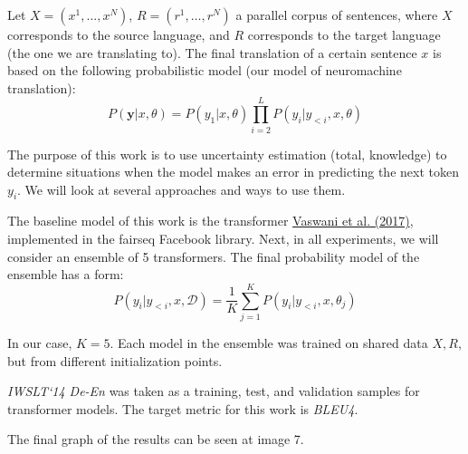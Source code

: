\documentclass[a4paper,14pt]{extarticle}
\newcommand{\bibref}[3]{\hyperlink{#1}{#2 (#3)}}
\begin{document}
	Let $X = (x^1, \dots, x^N)$, $R = (r^1, \dots, r^N)$ a parallel corpus of sentences, where $X$ corresponds to the source language, and $R$ corresponds to the target language (the one we are translating to). The final translation of a certain sentence $x$ is based on the following probabilistic model (our model of neuromachine translation):
	\begin{equation*}
		P(\textbf{y} | x, \theta) = P(y_1 | x, \theta) \prod_{i=2}^{L} P(y_i | y_{<i}, x, \theta)
	\end{equation*}
	
	The purpose of this work is to use uncertainty estimation (total, knowledge) to determine situations when the model makes an error in predicting the next token $y_i$. We will look at several approaches and ways to use them.

	The baseline model of this work is the transformer \bibref{transformer}{Vaswani et al.} {2017}, implemented in the fairseq Facebook library. Next, in all experiments, we will consider an ensemble of 5 transformers. The final probability model of the ensemble has a form:
	\begin{equation*}
		P(y_i | y_{<i}, x, \mathcal{D}) = \frac1{K} \sum_{j=1}^{K}P(y_i | y_{<i}, x, \theta_j)
	\end{equation*}
	
	In our case, $K=5$. Each model in the ensemble was trained on shared data $X, R$, but from different initialization points.

	\textit{IWSLT`14 De-En} was taken as a training, test, and validation samples for transformer models. The target metric for this work is \textit{BLEU4}.

	The final graph of the results can be seen at image 7.
	
	\begin{figure}[t]
	\end{figure}
	
\end{document}
